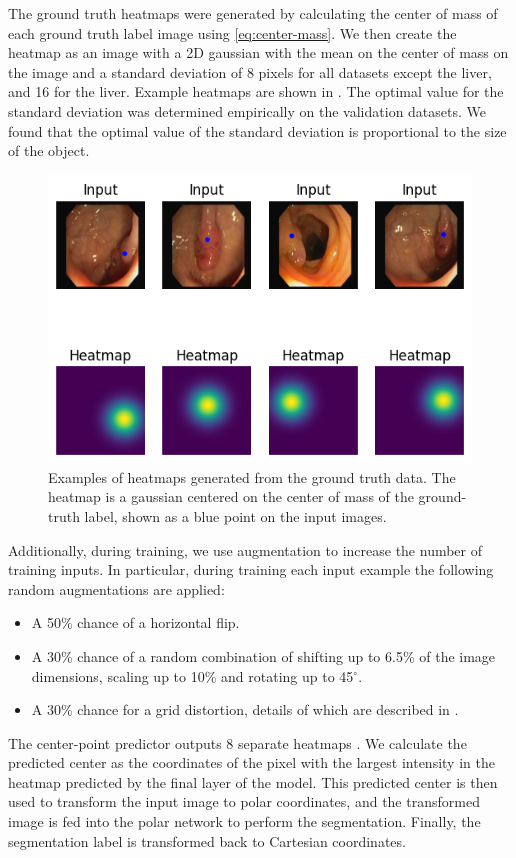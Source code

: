 The ground truth heatmaps were generated by calculating the center of mass of each ground truth label 
image using \eqref{eq:center-mass}. We then create the heatmap as an image with a 2D gaussian with the
mean on 
the center of mass on the image and a standard deviation of 8 pixels for all datasets except the liver, and 16 for the liver.
Example heatmaps are shown in 
. The optimal value for the standard deviation was determined empirically on the 
validation datasets. We found that the optimal value of the standard deviation is proportional to the size 
of the object.

	\begin{figure}[h]
		\centering
		\includegraphics[width=0.8\linewidth]{images/4/heatmaps}
		\caption{Examples of heatmaps generated from the ground truth data. The heatmap is a gaussian centered on the center of mass of the ground-truth label, shown as a blue point on the input images.}
		\label{fig:heatmap}
	\end{figure}

Additionally, during training, we use augmentation to increase the number of training inputs. In 
particular, during training each input example the following random augmentations are applied:

\begin{itemize}
  \item A 50\% chance of a horizontal flip.
  \item A 30\% chance of a random combination of shifting up to 6.5\% of the image dimensions, scaling up 
    to 10\% and rotating up to 45$^{\circ}$.
  \item A 30\% chance for a grid distortion, details of which are described in \cite{info11020125}.
\end{itemize}

The center-point predictor outputs 8 separate heatmaps \cite{newellStackedHourglassNetworks2016}. We
calculate the predicted center as the coordinates of the pixel with the largest intensity in the heatmap
predicted by the final layer of the model. This predicted center is then used to transform the input
image to polar coordinates, and the transformed image is fed into the polar network to perform
the segmentation. Finally, the segmentation label is transformed back to Cartesian coordinates.
    

